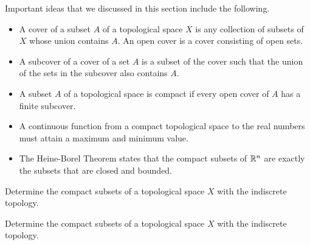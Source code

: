 Important ideas that we discussed in this section include the following.
\begin{itemize}
\item A cover of a subset $A$ of a topological space $X$ is any collection of subsets of $X$ whose union contains $A$. An open cover is a cover consisting of open sets. 
\item A subcover of a cover of a set $A$ is a subset of the cover such that the union of the sets in the subcover also contains $A$.
\item A subset $A$ of a topological space is compact if every open cover of $A$ has a finite subcover. 
\item A continuous function from a compact topological space to the real numbers must attain a maximum and minimum value. 
\item The Heine-Borel Theorem states that the compact subsets of $\mathbb{R}^n$ are exactly the subsets that are closed and bounded. 
\end{itemize}



\be

\item 
	\ba
	\item Determine the compact subsets of a topological space $X$ with the indiscrete topology.
	
	\item Determine the compact subsets of a topological space $X$ with the indiscrete topology.
	
	\ea

\begin{comment}
	
\ExerciseSolution

\ba

\item Let $X$ be a topological space with the discrete topology, and let $A$ be a nonempty subset of $X$. If $\{O_{\alpha}\}_{\alpha \in I}$ is an open cover of $A$, then at least one of the open sets must be $X$. So $\{X\}$ is a finite subcover of $A$. This shows that every subset of $X$ is compact. 

\item Let $X$ be a topological space with the discrete topology. We know that finite sets are compact, so suppose that $A$ is an infinite subset of $X$. Every subset of $X$ is open, so the collection $\{\{a\}\}_{a \in A}$ is an open cover of $A$. But if we eliminate any set from this open cover, the resulting collection won't cover $A$. So we have found an open cover of $A$ with no finite subcover. We conclude that the only compact subsets of $X$ are the finite subsets. 

\ea

\end{comment}


